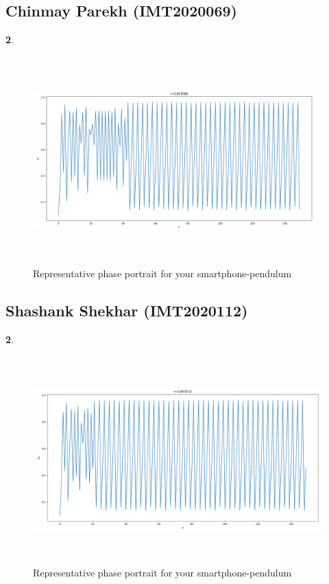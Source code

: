 \documentclass[11pt]{scrartcl} %
\begin{document}
\subsection{Chinmay Parekh (IMT2020069)}
\textbf{2}.
\begin{figure}[h] %
	\centering
	\includegraphics[width=12cm, height=8cm]{chinmay69.png} %
	\caption {Representative phase portrait for your smartphone-pendulum}
\end{figure}
\subsection{Shashank Shekhar (IMT2020112)}
\textbf{2}.
\begin{figure}[h] %
	\centering
	\includegraphics[width=12cm, height=8cm]{shashank.png} %
	\caption {Representative phase portrait for your smartphone-pendulum}
\end{figure}
\end{document}
